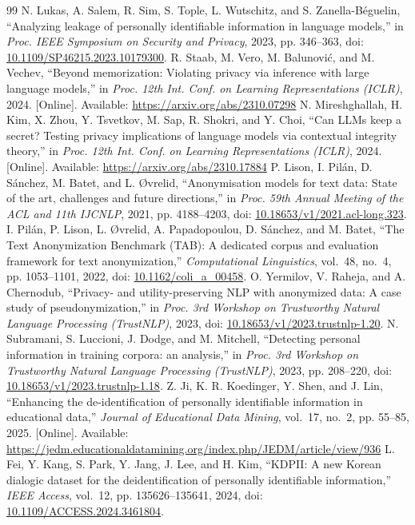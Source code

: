 \documentclass[12pt,a4paper]{article}
\newcommand{\doi}[1]{doi: \href{https://doi.org/#1}{#1}}
\begin{document}
\begin{thebibliography}{99}
 N. Lukas, A. Salem, R. Sim, S. Tople, L. Wutschitz, and S. Zanella-Béguelin, ``Analyzing leakage of personally identifiable information in language models,'' in \emph{Proc. IEEE Symposium on Security and Privacy}, 2023, pp. 346--363, \doi{10.1109/SP46215.2023.10179300}.
 R. Staab, M. Vero, M. Balunović, and M. Vechev, ``Beyond memorization: Violating privacy via inference with large language models,'' in \emph{Proc. 12th Int. Conf. on Learning Representations (ICLR)}, 2024. [Online]. Available: \url{https://arxiv.org/abs/2310.07298}
 N. Mireshghallah, H. Kim, X. Zhou, Y. Tsvetkov, M. Sap, R. Shokri, and Y. Choi, ``Can LLMs keep a secret? Testing privacy implications of language models via contextual integrity theory,'' in \emph{Proc. 12th Int. Conf. on Learning Representations (ICLR)}, 2024. [Online]. Available: \url{https://arxiv.org/abs/2310.17884}
 P. Lison, I. Pilán, D. Sánchez, M. Batet, and L. Øvrelid, ``Anonymisation models for text data: State of the art, challenges and future directions,'' in \emph{Proc. 59th Annual Meeting of the ACL and 11th IJCNLP}, 2021, pp. 4188--4203, \doi{10.18653/v1/2021.acl-long.323}.
 I. Pilán, P. Lison, L. Øvrelid, A. Papadopoulou, D. Sánchez, and M. Batet, ``The Text Anonymization Benchmark (TAB): A dedicated corpus and evaluation framework for text anonymization,'' \emph{Computational Linguistics}, vol.~48, no.~4, pp. 1053--1101, 2022, doi: \href{https://doi.org/10.1162/coli_a_00458}{10.1162/coli\_a\_00458}.
 O. Yermilov, V. Raheja, and A. Chernodub, ``Privacy- and utility-preserving NLP with anonymized data: A case study of pseudonymization,'' in \emph{Proc. 3rd Workshop on Trustworthy Natural Language Processing (TrustNLP)}, 2023, \doi{10.18653/v1/2023.trustnlp-1.20}.
 N. Subramani, S. Luccioni, J. Dodge, and M. Mitchell, ``Detecting personal information in training corpora: an analysis,'' in \emph{Proc. 3rd Workshop on Trustworthy Natural Language Processing (TrustNLP)}, 2023, pp. 208--220, \doi{10.18653/v1/2023.trustnlp-1.18}.
 Z. Ji, K. R. Koedinger, Y. Shen, and J. Lin, ``Enhancing the de-identification of personally identifiable information in educational data,'' \emph{Journal of Educational Data Mining}, vol.~17, no.~2, pp. 55--85, 2025. [Online]. Available: \url{https://jedm.educationaldatamining.org/index.php/JEDM/article/view/936}
 L. Fei, Y. Kang, S. Park, Y. Jang, J. Lee, and H. Kim, ``KDPII: A new Korean dialogic dataset for the deidentification of personally identifiable information,'' \emph{IEEE Access}, vol.~12, pp. 135626--135641, 2024, \doi{10.1109/ACCESS.2024.3461804}.

\end{thebibliography}
\end{document}
